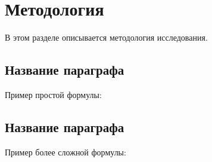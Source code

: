 \section{Методология}
\label{sec:Method}

В этом разделе описывается методология исследования.

\subsection{Название параграфа}
\label{sec:}

Пример простой формулы:


\subsection{Название параграфа}
\label{sec:}

Пример более сложной формулы:
